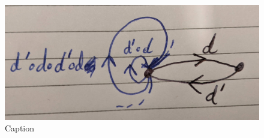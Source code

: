 \begin{figure}
    \centering
    \includegraphics[width=0.5\linewidth]{2MathematicalFramework/InitialFramework/Images/D_commonly_large.jpg}
    \caption{Caption}
    \label{fig:enter-label}
\end{figure}
